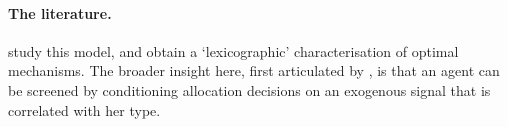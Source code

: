 \paragraph{The literature.}
\textcite{BlochDuttaDziubinski2021} study this model, and obtain a  `lexicographic' characterisation of optimal mechanisms.
The broader insight here, first articulated by \textcite{Kattwinkel2019}, is that an agent can be screened by conditioning allocation decisions on an exogenous signal that is correlated with her type.
